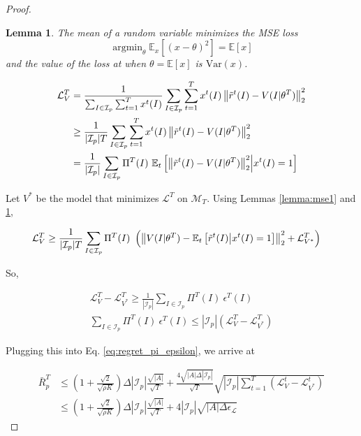 \documentclass{article}
\newtheorem{lemma}{Lemma}
\DeclareMathOperator*{\argmin}{argmin}
\begin{document}
\begin{proof}
\begin{lemma} The mean of a random variable minimizes the MSE loss
\label{lemma:mse2}
\begin{equation}
\argmin_\theta \mathbb{E}_x[(x - \theta)^2] = \mathbb{E}[x]
\end{equation}
and the value of the loss at when $\theta = \mathbb{E}[x]$ is $\mathrm{Var}(x)$.
\end{lemma}

\begin{align}
    \mathcal{L}_V^T & = \frac{1}{ \sum_{I \in \mathcal{I}_p} \sum_{t=1}^T x^t(I) } \sum_{I \in \mathcal{I}_p}  \sum_{t=1}^T x^t(I) \left\lVert \tilde{r}^t(I) - V(I|\theta^T)\right\rVert_2^2 \\
    & \geq  \frac{1}{|\mathcal{I}_p| T} \sum_{I \in \mathcal{I}_p}  \sum_{t=1}^T x^t(I) \left\lVert \tilde{r}^t(I) - V(I|\theta^T)\right\rVert_2^2\\
    & = \frac{1}{|\mathcal{I}_p|} \sum_{I \in \mathcal{I}_p} \Pi^T(I)\ \mathbb{E}_t\left[ \left\lVert\tilde{r}^t(I) - V(I|\theta^T)\right\rVert_2^2 \middle| x^t(I)=1 \right]
\end{align}

Let $V^*$ be the model that minimizes $\mathcal{L}^T$ on $\mathcal{M}_T$. Using Lemmas \ref{lemma:mse1} and \ref{lemma:mse2},

\begin{align}
    \mathcal{L}_V^T & \geq \frac{1}{|\mathcal{I}_p| T} \sum_{I \in \mathcal{I}_p} \Pi^T(I)\ \left( \left\lVert V(I|\theta^T) - \mathbb{E}_t\left[\tilde{r}^t(I)\middle| x^t(I)=1\right]\right\rVert_2^2 + \mathcal{L}^T_{V^*} \right)
\end{align}

So, 

\begin{align}
    \mathcal{L}_V^T - \mathcal{L}_{V^*}^T  \geq \frac{1}{|\mathcal{I}_p|} \sum_{I \in \mathcal{I}_p} \Pi^T(I)\ \epsilon^T(I) \\
    \sum_{I \in \mathcal{I}_p} \Pi^T(I)\ \epsilon^T(I) \leq |\mathcal{I}_p| (\mathcal{L}_V^T - \mathcal{L}_{V^*}^T)
\end{align}

Plugging this into Eq. \ref{eq:regret_pi_epsilon}, we arrive at

\begin{align}
    \bar{R}_p^T & \leq \left( 1 + \frac{\sqrt{2}}{\sqrt{\rho K}} \right) \Delta |\mathcal{I}_p| \frac{\sqrt{|A|}}{\sqrt{T}} +  \frac{4\sqrt{|A| \Delta |\mathcal{I}_p|}}{\sqrt{T}}  \sqrt{ |\mathcal{I}_p| \sum_{t=1}^T  (\mathcal{L}_V^t - \mathcal{L}_{V^*}^t) } \\
    & \leq \left( 1 + \frac{\sqrt{2}}{\sqrt{\rho K}} \right) \Delta |\mathcal{I}_p| \frac{\sqrt{|A|}}{\sqrt{T}} +  4 |\mathcal{I}_p| \sqrt{|A| \Delta \epsilon_\mathcal{L}}
\end{align}


\end{proof}
\end{document}

